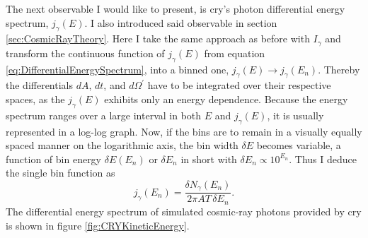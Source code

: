 The next observable I would like to present, is \gls{cry}'s photon differential energy spectrum, $j_\gamma(E)$. I also introduced said observable in section \ref{sec:CosmicRayTheory}. Here I take the same approach as before with $I_\gamma$ and transform the continuous function of $j_\gamma(E)$ from equation \ref{eq:DifferentialEnergySpectrum}, into a binned one, \ie $j_\gamma(E) \to j_\gamma(E_n)$. Thereby the differentials $dA$, $dt$, and $d\Omega^{\prime}$ have to be integrated over their respective spaces, as the $j_\gamma(E)$ exhibits only an energy dependence. Because the energy spectrum ranges over a large interval in both $E$ and $j_\gamma(E)$, it is usually represented in a log-log graph. Now, if the bins are to remain in a visually equally spaced manner on the logarithmic axis, the bin width $\delta E$ becomes variable, \ie a function of bin energy $\delta E(E_n)$ or $\delta E_n$ in short with $\delta E_n \propto 10^{E_n}$. Thus I deduce the single bin function as
\begin{equation} \label{eq:BinnedDifferentialEnergySpectrum}
    j_\gamma(E_n) = \frac{\delta N_\gamma(E_n)}{2\pi AT\, \delta E_n}.
\end{equation}
The differential energy spectrum of simulated cosmic-ray photons provided by \gls{cry} is shown in figure \ref{fig:CRYKineticEnergy}.
